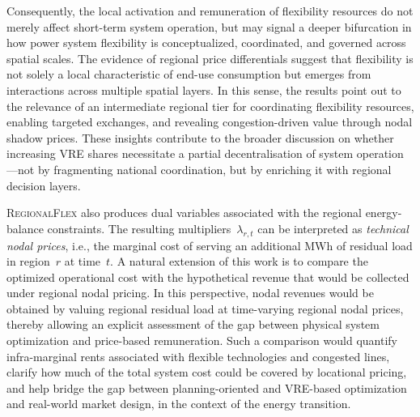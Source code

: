 \documentclass[12pt]{article}
\begin{document}
Consequently, the local activation and remuneration of flexibility resources do not merely affect short-term system operation, but may signal a deeper bifurcation in how power system flexibility is conceptualized, coordinated, and governed across spatial scales. The 
evidence of regional price differentials suggest that flexibility is not solely a local characteristic of end-use consumption but emerges from interactions across multiple spatial layers. In this sense, the results point out to the relevance of an intermediate regional tier for coordinating flexibility resources, enabling targeted exchanges, and revealing congestion-driven value through nodal shadow prices. These 
insights contribute to the broader discussion on whether increasing VRE shares 
necessitate a partial decentralisation of system operation---not by fragmenting 
national coordination, but by enriching it with regional decision layers.

\medskip

\noindent
\textsc{RegionalFlex} also produces dual variables associated with the regional 
energy-balance constraints. The resulting multipliers~$\lambda_{r,t}$ can be 
interpreted as \emph{technical nodal prices}, i.e., the marginal cost of serving an 
additional MWh of residual load in region~$r$ at time~$t$. A natural extension of this work is to compare the optimized operational cost with the hypothetical revenue that would be collected under regional nodal pricing. In this perspective, nodal revenues would be obtained by valuing regional residual load at time-varying regional nodal prices, thereby allowing an explicit assessment of the gap between physical system optimization and price-based remuneration.
Such a comparison would quantify infra-marginal rents associated with flexible 
technologies and congested lines, clarify how much of the total system cost could 
be covered by locational pricing, and help bridge the gap between planning-oriented and VRE-based optimization and real-world market design, in the context of the energy transition.

\medskip
\end{document}
